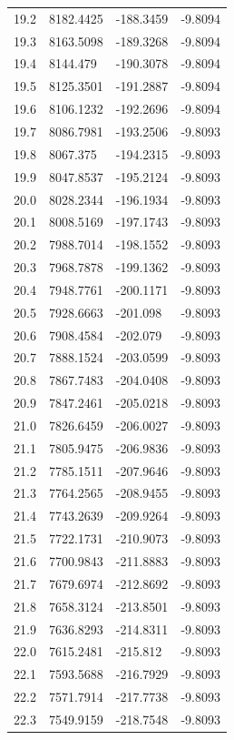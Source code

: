 \begin{table}[H]
\begin{tabular}{llll}
19.2 & 8182.4425 & -188.3459 & -9.8094 \\
19.3 & 8163.5098 & -189.3268 & -9.8094 \\
19.4 & 8144.479 & -190.3078 & -9.8094 \\
19.5 & 8125.3501 & -191.2887 & -9.8094 \\
19.6 & 8106.1232 & -192.2696 & -9.8094 \\
19.7 & 8086.7981 & -193.2506 & -9.8093 \\
19.8 & 8067.375 & -194.2315 & -9.8093 \\
19.9 & 8047.8537 & -195.2124 & -9.8093 \\
20.0 & 8028.2344 & -196.1934 & -9.8093 \\
20.1 & 8008.5169 & -197.1743 & -9.8093 \\
20.2 & 7988.7014 & -198.1552 & -9.8093 \\
20.3 & 7968.7878 & -199.1362 & -9.8093 \\
20.4 & 7948.7761 & -200.1171 & -9.8093 \\
20.5 & 7928.6663 & -201.098 & -9.8093 \\
20.6 & 7908.4584 & -202.079 & -9.8093 \\
20.7 & 7888.1524 & -203.0599 & -9.8093 \\
20.8 & 7867.7483 & -204.0408 & -9.8093 \\
20.9 & 7847.2461 & -205.0218 & -9.8093 \\
21.0 & 7826.6459 & -206.0027 & -9.8093 \\
21.1 & 7805.9475 & -206.9836 & -9.8093 \\
21.2 & 7785.1511 & -207.9646 & -9.8093 \\
21.3 & 7764.2565 & -208.9455 & -9.8093 \\
21.4 & 7743.2639 & -209.9264 & -9.8093 \\
21.5 & 7722.1731 & -210.9073 & -9.8093 \\
21.6 & 7700.9843 & -211.8883 & -9.8093 \\
21.7 & 7679.6974 & -212.8692 & -9.8093 \\
21.8 & 7658.3124 & -213.8501 & -9.8093 \\
21.9 & 7636.8293 & -214.8311 & -9.8093 \\
22.0 & 7615.2481 & -215.812 & -9.8093 \\
22.1 & 7593.5688 & -216.7929 & -9.8093 \\
22.2 & 7571.7914 & -217.7738 & -9.8093 \\
22.3 & 7549.9159 & -218.7548 & -9.8093 \\

\end{tabular}
\end{table}
